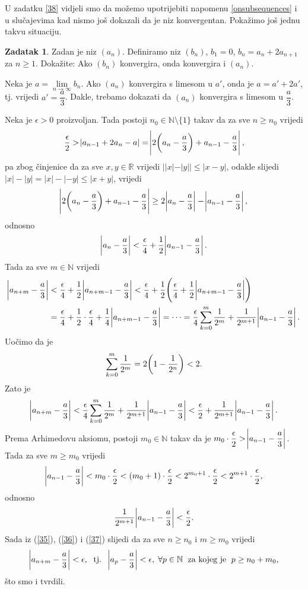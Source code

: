 \documentclass{book}
\let\originalleft\left
\let\originalright\right
\renewcommand{\left}{\mathopen{}\mathclose\bgroup\originalleft}
\renewcommand{\right}{\aftergroup\egroup\originalright}
\renewenvironment{proof}{%
    \vspace{-\parskip}\begin{oldproof}%
    }{%
    \end{oldproof}%
}
\theoremstyle{definition}
\theoremstyle{definition}
\newtheorem{exercise}{Zadatak}
\theoremstyle{remark}
\begin{document}
U zadatku \ref{38} vidjeli smo da možemo upotrijebiti napomenu \ref{onsubsequences} i u slučajevima kad nismo još dokazali da je niz konvergentan. Pokažimo još jednu takvu situaciju.
\begin{exercise}
\label{iteration}
Zadan je niz $(a_n)$. Definiramo niz $(b_n)$, $b_1=0$, $b_n=a_{n}+2a_{n+1}$ za $n\geq 1$. Dokažite: Ako $(b_n)$ konvergira, onda konvergira i $(a_n)$.
\end{exercise}
\begin{proof}
Neka je $a=\lim\limits_{n\to \infty}{b_n}$. Ako $(a_n)$ konvergira s limesom u $a'$, onda je $a=a'+2a'$, tj. vrijedi $a'=\dfrac{a}{3}$. Dakle, trebamo dokazati da $(a_n)$ konvergira s limesom u $\dfrac{a}{3}$.

Neka je $\epsilon>0$ proizvoljan. Tada postoji $n_0\in \mathbb{N}\setminus\{1\}$ takav da za sve $n\geq n_0$ vrijedi
\begin{gather}
\label{35}
\dfrac{\epsilon}{2}>\abs{a_{n-1}+2a_n-a}=\abs{2\left(a_n-\dfrac{a}{3}\right)+a_{n-1}-\dfrac{a}{3}},
\end{gather}
pa zbog činjenice da za sve $x, y\in \mathbb{R}$ vrijedi $||x|-|y||\leq |x-y|$, odakle slijedi $|x|-|y|=|x|-|-y|\leq |x+y|$, vrijedi
$$\abs{2\left(a_n-\dfrac{a}{3}\right)+a_{n-1}-\dfrac{a}{3}}\geq 2\abs{a_n-\dfrac{a}{3}}-\abs{a_{n-1}-\dfrac{a}{3}},$$
odnosno
$$\abs{a_n-\dfrac{a}{3}}<\dfrac{\epsilon}{4}+\dfrac{1}{2}\abs{a_{n-1}-\dfrac{a}{3}}.$$
Tada za sve $m\in \mathbb{N}$ vrijedi
\begin{align*}
\abs{a_{n+m}-\dfrac{a}{3}}&<\dfrac{\epsilon}{4}+\dfrac{1}{2}\abs{a_{n+m-1}-\dfrac{a}{3}}<\dfrac{\epsilon}{4}+\dfrac{1}{2}\left(\dfrac{\epsilon}{4}+\dfrac{1}{2}\abs{a_{n+m-1}-\dfrac{a}{3}}\right)\\
&=\dfrac{\epsilon}{4}+\dfrac{1}{2}\cdot\dfrac{\epsilon}{4}+\dfrac{1}{4}\abs{a_{n+m-1}-\dfrac{a}{3}}=\dots=\dfrac{\epsilon}{4}\sum_{k=0}^m{\dfrac{1}{2^m}}+\dfrac{1}{2^{m+1}}\abs{a_{n-1}-\dfrac{a}{3}}.
\end{align*}
Uočimo da je $$\sum_{k=0}^m{\dfrac{1}{2^m}}=2\left(1-\dfrac{1}{2^n}\right)<2.$$
Zato je
\begin{gather}
\label{36}
\abs{a_{n+m}-\dfrac{a}{3}}<\dfrac{\epsilon}{4}\sum_{k=0}^m{\dfrac{1}{2^m}}+\dfrac{1}{2^{m+1}}\abs{a_{n-1}-\dfrac{a}{3}}<\dfrac{\epsilon}{2}+\dfrac{1}{2^{m+1}}\abs{a_{n-1}-\dfrac{a}{3}}.
\end{gather}
Prema Arhimedovu aksiomu, postoji $m_0\in \mathbb{N}$ takav da je $m_0\cdot\dfrac{\epsilon}{2}>\abs{a_{n-1}-\dfrac{a}{3}}$. Tada za sve $m\geq m_0$ vrijedi
$$\abs{a_{n-1}-\dfrac{a}{3}}<m_0\cdot\dfrac{\epsilon}{2}<(m_0+1)\cdot\dfrac{\epsilon}{2}<2^{m_0+1}\cdot\dfrac{\epsilon}{2}<2^{m+1}\cdot\dfrac{\epsilon}{2},$$
odnosno
\begin{gather}
\label{37}
\dfrac{1}{2^{m+1}}\abs{a_{n-1}-\dfrac{a}{3}}<\dfrac{\epsilon}{2}.
\end{gather}
Sada iz (\ref{35}), (\ref{36}) i (\ref{37}) slijedi da za sve $n\geq n_0$ i $m\geq m_0$ vrijedi
$$\abs{a_{n+m}-\dfrac{a}{3}}<\epsilon,\;\text{ tj. }\; \abs{a_{p}-\dfrac{a}{3}}<\epsilon,\; \forall p\in \mathbb{N}\;\text{ za kojeg je }\; p\geq n_0+m_0,$$
što smo i tvrdili.
\end{proof}
\end{document}

